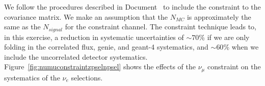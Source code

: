 \par We follow the procedures described in Document~\cite{bib:muonconstraint} to include the %
\numu constraint to the covariance matrix. We make an assumption that the $N_{MC}$ is approximately the same as the $N_{signal}$ for the constraint channel. The constraint technique leads to, in this exercise, a reduction in systematic uncertainties of $\sim70$\% if we are only folding in the correlated flux, genie, and geant-4 systematics, and $\sim60$\% when we include the uncorrelated detector systematics.
Figure~\ref{fig:numuconstraintzpselnpsel} shows the effects of the $\nu_\mu$ constraint on the systematics of the \npsel $\nu_e$ selections.

